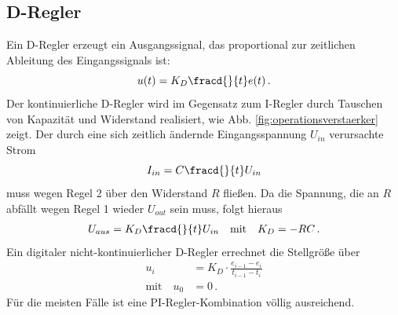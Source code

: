 \subsection{D-Regler}\label{d-regler}
Ein D-Regler erzeugt ein Ausgangssignal, das proportional zur zeitlichen
Ableitung des Eingangssignals ist:
\begin{equation}\label{eq:d-regler_01}
	u(t)=K_D\fracd{}{t}e(t)\,.
\end{equation}
Der kontinuierliche D-Regler wird im Gegensatz zum I-Regler durch Tauschen von
Kapazität und Widerstand realisiert, wie Abb.
\ref{fig:operationsverstaerker}
zeigt. Der durch eine sich zeitlich ändernde Eingangsspannung $U_{in}$ verursachte Strom
\begin{equation}\label{eq:d-regler_02}
	I_{in}=C\fracd{}{t}U_{in}
\end{equation}
muss wegen Regel 2 über den Widerstand $R$ fließen. Da die Spannung, die an $R$
abfällt wegen Regel 1 wieder $U_{out}$ sein muss, folgt hieraus
\begin{equation}\label{eq:d-regler_03}
	\begin{split}
		U_{aus}=K_D\fracd{}{t}U_{in}
		\quad\text{mit}\quad
		K_D=-RC\,.
	\end{split}
\end{equation}
Ein digitaler nicht-kontinuierlicher D-Regler errechnet die Stellgröße über
\begin{equation}\label{eq:i-regler_03}
	\begin{split}
		u_i&=K_D\cdot\frac{e_{i-1}-e_i}{t_{i-1}-t_i}\\
		\text{mit}\quad
		u_{0}&=0\,.
	\end{split}
\end{equation}
Für die meisten Fälle ist eine PI-Regler-Kombination völlig ausreichend.

